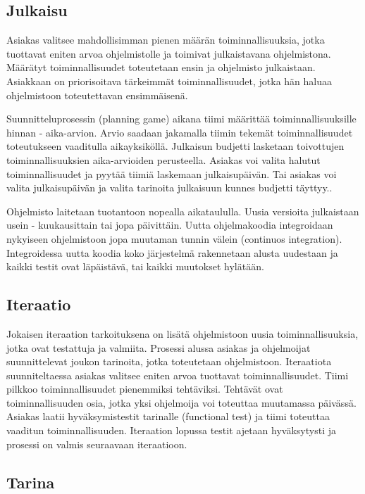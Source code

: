 \documentclass[finnish]{tktltiki2}
\theoremstyle{definition}
\theoremstyle{remark}
\begin{document}
\subsection*{Julkaisu}

Asiakas valitsee mahdollisimman pienen määrän toiminnallisuuksia, jotka tuottavat eniten arvoa ohjelmistolle ja toimivat julkaistavana ohjelmistona. Määrätyt toiminnallisuudet toteutetaan ensin ja ohjelmisto julkaistaan. Asiakkaan on priorisoitava tärkeimmät toiminnallisuudet, jotka hän haluaa ohjelmistoon toteutettavan ensimmäisenä\cite{BEC99}. 

Suunnitteluprosessin (planning game) aikana tiimi määrittää toiminnallisuuksille hinnan - aika-arvion. Arvio saadaan jakamalla tiimin tekemät toiminnallisuudet toteutukseen vaaditulla aikayksiköllä. Julkaisun budjetti lasketaan toivottujen toiminnallisuuksien aika-arvioiden perusteella. Asiakas voi valita halutut toiminnallisuudet ja pyytää tiimiä laskemaan julkaisupäivän. Tai asiakas voi valita julkaisupäivän ja valita tarinoita julkaisuun kunnes budjetti täyttyy.\cite{BEC99}.

Ohjelmisto laitetaan tuotantoon nopealla aikataululla. Uusia versioita julkaistaan usein - kuukausittain tai jopa päivittäin. Uutta ohjelmakoodia integroidaan nykyiseen ohjelmistoon jopa muutaman tunnin välein (continuos integration). Integroidessa uutta koodia koko järjestelmä rakennetaan alusta uudestaan ja kaikki testit ovat läpäistävä, tai kaikki muutokset hylätään\cite{BEC99}.  


\subsection*{Iteraatio}

Jokaisen iteraation tarkoituksena on lisätä ohjelmistoon uusia toiminnallisuuksia, jotka ovat testattuja ja valmiita. Prosessi alussa asiakas ja ohjelmoijat suunnittelevat joukon tarinoita, jotka toteutetaan ohjelmistoon. Iteraatiota suunniteltaessa asiakas valitsee eniten arvoa tuottavat toiminnallisuudet. Tiimi pilkkoo toiminnallisuudet pienemmiksi tehtäviksi. Tehtävät ovat toiminnallisuuden osia, jotka yksi ohjelmoija voi toteuttaa muutamassa päivässä. Asiakas laatii hyväksymistestit tarinalle (functional test) ja tiimi toteuttaa vaaditun toiminnallisuuden. Iteraation lopussa testit ajetaan hyväksytysti ja prosessi on valmis seuraavaan iteraatioon\cite{BEC99}.

\subsection*{Tarina}
\end{document}
